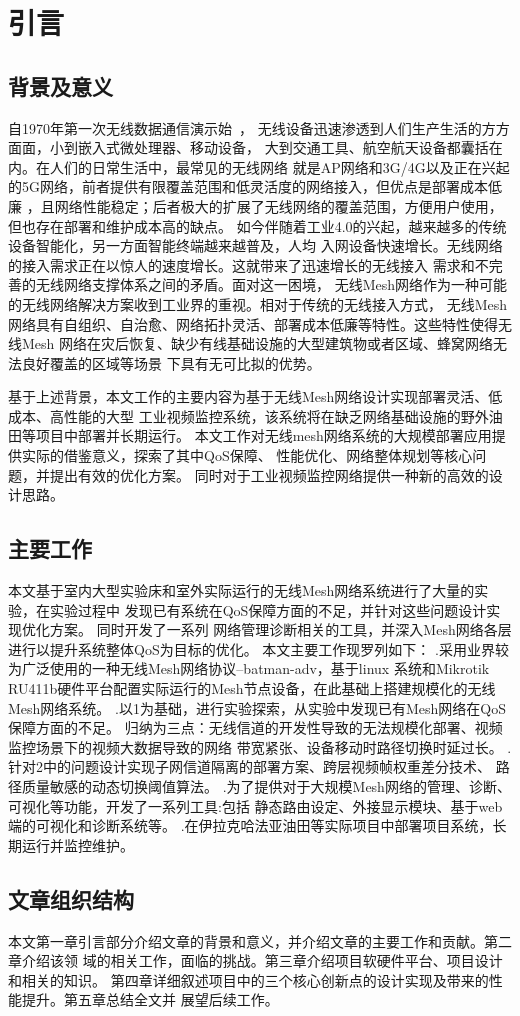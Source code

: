 \chapter{引言}
\label{cha:intro}

\section{背景及意义}
自1970年第一次无线数据通信演示始~\cite{IEEE80211}，
无线设备迅速渗透到人们生产生活的方方面面，小到嵌入式微处理器、移动设备，
大到交通工具、航空航天设备都囊括在内。在人们的日常生活中，最常见的无线网络
就是AP网络和3G/4G以及正在兴起的5G网络，前者提供有限覆盖范围和低灵活度的网络接入，但优点是部署成本低廉
，且网络性能稳定；后者极大的扩展了无线网络的覆盖范围，方便用户使用，
但也存在部署和维护成本高的缺点。
如今伴随着工业4.0的兴起，越来越多的传统设备智能化，另一方面智能终端越来越普及，人均
入网设备快速增长。无线网络的接入需求正在以惊人的速度增长。这就带来了迅速增长的无线接入
需求和不完善的无线网络支撑体系之间的矛盾。面对这一困境，
无线Mesh网络作为一种可能的无线网络解决方案收到工业界的重视。相对于传统的无线接入方式，
无线Mesh网络具有自组织、自治愈、网络拓扑灵活、部署成本低廉等特性。这些特性使得无线Mesh
网络在灾后恢复、缺少有线基础设施的大型建筑物或者区域、蜂窝网络无法良好覆盖的区域等场景
下具有无可比拟的优势。

基于上述背景，本文工作的主要内容为基于无线Mesh网络设计实现部署灵活、低成本、高性能的大型
工业视频监控系统，该系统将在缺乏网络基础设施的野外油田等项目中部署并长期运行。
本文工作对无线mesh网络系统的大规模部署应用提供实际的借鉴意义，探索了其中QoS保障、
性能优化、网络整体规划等核心问题，并提出有效的优化方案。
同时对于工业视频监控网络提供一种新的高效的设计思路。

\section{主要工作}
本文基于室内大型实验床和室外实际运行的无线Mesh网络系统进行了大量的实验，在实验过程中
发现已有系统在QoS保障方面的不足，并针对这些问题设计实现优化方案。
同时开发了一系列
网络管理诊断相关的工具，并深入Mesh网络各层进行以提升系统整体QoS为目标的优化。
本文主要工作现罗列如下：
.采用业界较为广泛使用的一种无线Mesh网络协议--batman-adv，基于linux
系统和Mikrotik RU411b硬件平台配置实际运行的Mesh节点设备，在此基础上搭建规模化的无线Mesh网络系统。
.以1为基础，进行实验探索，从实验中发现已有Mesh网络在QoS保障方面的不足。
归纳为三点：无线信道的开发性导致的无法规模化部署、视频监控场景下的视频大数据导致的网络
带宽紧张、设备移动时路径切换时延过长。
.针对2中的问题设计实现子网信道隔离的部署方案、跨层视频帧权重差分技术、
路径质量敏感的动态切换阈值算法。
.为了提供对于大规模Mesh网络的管理、诊断、可视化等功能，开发了一系列工具:包括
静态路由设定、外接显示模块、基于web端的可视化和诊断系统等。
.在伊拉克哈法亚油田等实际项目中部署项目系统，长期运行并监控维护。

\section{文章组织结构}
本文第一章引言部分介绍文章的背景和意义，并介绍文章的主要工作和贡献。第二章介绍该领
域的相关工作，面临的挑战。第三章介绍项目软硬件平台、项目设计和相关的知识。
第四章详细叙述项目中的三个核心创新点的设计实现及带来的性能提升。第五章总结全文并
展望后续工作。


